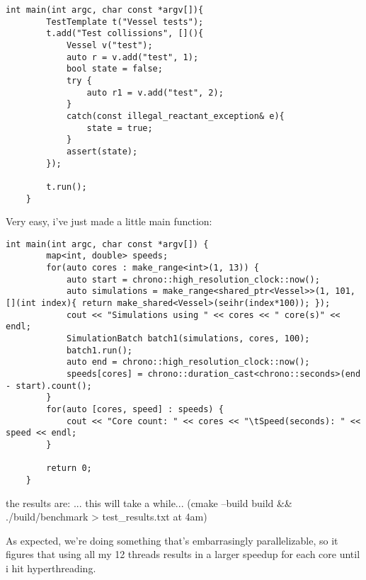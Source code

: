 \begin{lstlisting}[style=colorC++]
    int main(int argc, char const *argv[]){
        TestTemplate t("Vessel tests");
        t.add("Test collissions", [](){
            Vessel v("test");
            auto r = v.add("test", 1);
            bool state = false;
            try {
                auto r1 = v.add("test", 2);
            }
            catch(const illegal_reactant_exception& e){
                state = true;
            }
            assert(state);
        });

        t.run();
    }
\end{lstlisting}


Very easy, i've just made a little main function:

\begin{lstlisting}[style=colorC++]
    int main(int argc, char const *argv[]) {
        map<int, double> speeds;
        for(auto cores : make_range<int>(1, 13)) {
            auto start = chrono::high_resolution_clock::now();
            auto simulations = make_range<shared_ptr<Vessel>>(1, 101, [](int index){ return make_shared<Vessel>(seihr(index*100)); });
            cout << "Simulations using " << cores << " core(s)" << endl;
            SimulationBatch batch1(simulations, cores, 100);
            batch1.run();
            auto end = chrono::high_resolution_clock::now();
            speeds[cores] = chrono::duration_cast<chrono::seconds>(end - start).count();
        }
        for(auto [cores, speed] : speeds) {
            cout << "Core count: " << cores << "\tSpeed(seconds): " << speed << endl;
        }

        return 0;
    }
\end{lstlisting}

the results are: ... this will take a while... (cmake --build build \&\& ./build/benchmark > test\_results.txt at 4am)

As expected, we're doing something that's embarrasingly parallelizable, so it figures that using all my 12 threads results in a larger speedup for each core until i hit hyperthreading.